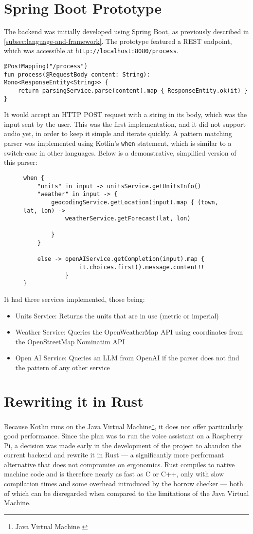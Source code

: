 \section{Spring Boot Prototype}
The backend was initially developed using Spring Boot, as previously described in \ref{subsec:language-and-framework}.
The prototype featured a REST endpoint, which was accessible at \texttt{http://localhost:8080/process}.
\begin{verbatim}
@PostMapping("/process")
fun process(@RequestBody content: String): Mono<ResponseEntity<String>> {
    return parsingService.parse(content).map { ResponseEntity.ok(it) }
}
\end{verbatim}
It would accept an HTTP POST request with a string in its body, which was the input sent by the user.
This was the first implementation, and it did not support audio yet, in order to keep it simple and iterate quickly.
A pattern matching parser was implemented using Kotlin's \texttt{when} statement, which is similar to a switch-case in other languages.
Below is a demonstrative, simplified version of this parser:
\begin{figure}[H]
\begin{verbatim}
when {
    "units" in input -> unitsService.getUnitsInfo()
    "weather" in input -> {
        geocodingService.getLocation(input).map { (town, lat, lon) ->
            weatherService.getForecast(lat, lon)

        }
    }

    else -> openAIService.getCompletion(input).map {
                it.choices.first().message.content!!
            }
}
\end{verbatim}
\end{figure}
It had three services implemented, those being:
\begin{itemize}
  \item Units Service: Returns the units that are in use (metric or imperial)
  \item Weather Service: Queries the OpenWeatherMap API using coordinates from the OpenStreetMap Nominatim API
  \item Open AI Service: Queries an LLM from OpenAI if the parser does not find the pattern of any other service
\end{itemize}

\section{Rewriting it in Rust}
Because Kotlin runs on the Java Virtual Machine\footnote{Java Virtual Machine \cite{jvm}},
it does not offer particularly good performance.
Since the plan was to run the voice assistant on a Raspberry Pi,
a decision was made early in the development of the project
to abandon the current backend and rewrite it in Rust ---
a significantly more performant alternative that does not compromise on ergonomics.
Rust compiles to native machine code and is therefore nearly as fast as C or C++,
only with slow compilation times and some overhead introduced by the borrow checker ---
both of which can be disregarded when compared to the limitations of the Java Virtual Machine.


